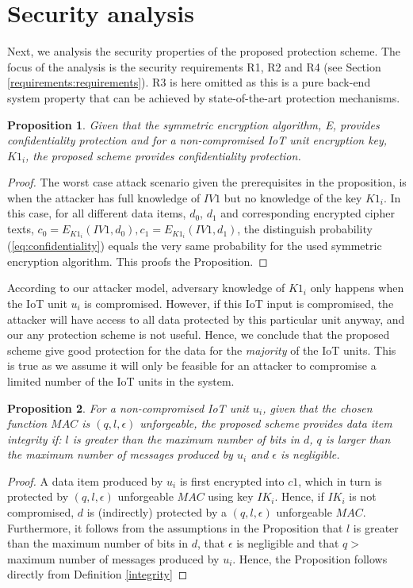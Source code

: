 {\section{Security analysis}
\label{secanalysis}
Next, we analysis the security properties of the proposed protection scheme. The focus of the analysis is the security requirements R1, R2 and R4 (see Section \ref{requirements:requirements}). R3 is here omitted as this is a pure back-end system property that can be achieved by state-of-the-art protection mechanisms.
\newtheorem{prop}{Proposition}
\begin{prop}
\label{analysis:confidentiality}
 Given that the symmetric encryption algorithm, E, provides confidentiality protection and for a non-compromised IoT unit encryption key, $K1_i$, the proposed scheme provides confidentiality protection.
\end{prop}
\begin{proof}
The worst case attack scenario given the prerequisites in the proposition, is when the attacker has full knowledge of $IV1$ but no knowledge of the key $K1_i$. In this case, for all different data items, $d_0$, $d_1$ and corresponding encrypted cipher texts, $c_0=E_{K1_i}(IV1,d_0), c_1=E_{K1_i}(IV1,d_1)$, the distinguish probability (\ref{eq:confidentiality}) equals the very same probability for the used symmetric encryption algorithm. This proofs the Proposition.
\end{proof}
According to our attacker model, adversary knowledge of $K1_i$ only happens when the IoT unit $u_i$ is compromised. However, if this IoT input is compromised, the attacker will have access to all data protected by this particular unit anyway, and our any protection scheme is not useful. Hence, we conclude that the proposed scheme give good protection for the data for the \textit{majority} of the IoT units. This is true as we assume it will only be feasible for an attacker to compromise a limited number of the IoT units in the system.
\begin{prop}
\label{analysis:integrity}
For a non-compromised IoT unit $u_i$, given that the chosen function $MAC$ is $(q,l,\epsilon)$ unforgeable, the proposed scheme provides data item integrity if: $l $ is greater than the maximum number of bits in $d$, $q$ is larger than the maximum number of messages produced by $u_i$ and $\epsilon$ is negligible.
\end{prop}
\begin{proof}
A data item produced by $u_i$ is first encrypted into $c1$, which in turn is protected by $(q,l,\epsilon)$ unforgeable $MAC$ using key $IK_i$. Hence, if $IK_i$ is not compromised, $d$ is (indirectly) protected by a $(q,l,\epsilon)$ unforgeable $MAC$. Furthermore, it follows from the assumptions in the Proposition that $l$ is greater than the maximum number of bits in $d$, that $\epsilon $ is negligible and that $q >$ maximum number of messages produced by $u_i$. Hence, the Proposition follows directly from Definition \ref{integrity}

\end{proof}}
